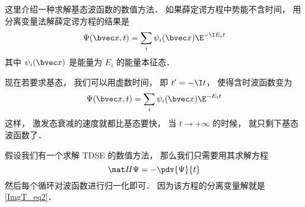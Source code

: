这里介绍一种求解基态波函数的数值方法． 如果薛定谔方程中势能不含时间， 用分离变量法解薛定谔方程的结果是
\begin{equation}
\Psi(\bvec x, t) = \sum_i \psi_i(\bvec x) \E^{-\I E_i t}
\end{equation}
其中 $\psi_i(\bvec x)$ 是能量为 $E_i$ 的能量本征态．

现在若要求基态， 我们可以用虚数时间， 即 $t' = -\I t$， 使得含时波函数变为
\begin{equation}\label{ImgT_eq2}
\Psi(\bvec x, t) = \sum_i \psi_i(\bvec x) \E^{- E_i t}
\end{equation}
这样， 激发态衰减的速度就都比基态要快， 当 $t \to +\infty$ 的时候， 就只剩下基态波函数了．

假设我们有一个求解 TDSE 的数值方法， 那么我们只需要用其求解方程
\begin{equation}
\mat H\Psi = -\pdv{\Psi}{t}
\end{equation}
然后每个循环对波函数进行归一化即可． 因为该方程的分离变量解就是\autoref{ImgT_eq2}．